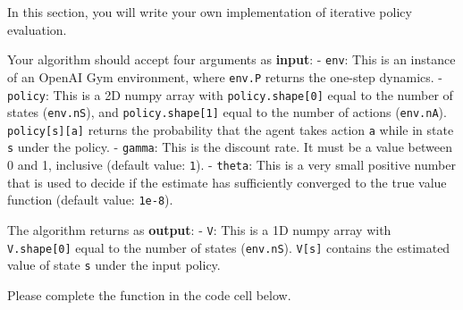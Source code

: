 \documentclass[11pt]{article}
\begin{document}
In this section, you will write your own implementation of iterative
policy evaluation.

Your algorithm should accept four arguments as \textbf{input}: -
\texttt{env}: This is an instance of an OpenAI Gym environment, where
\texttt{env.P} returns the one-step dynamics. - \texttt{policy}: This is
a 2D numpy array with \texttt{policy.shape{[}0{]}} equal to the number
of states (\texttt{env.nS}), and \texttt{policy.shape{[}1{]}} equal to
the number of actions (\texttt{env.nA}). \texttt{policy{[}s{]}{[}a{]}}
returns the probability that the agent takes action \texttt{a} while in
state \texttt{s} under the policy. - \texttt{gamma}: This is the
discount rate. It must be a value between 0 and 1, inclusive (default
value: \texttt{1}). - \texttt{theta}: This is a very small positive
number that is used to decide if the estimate has sufficiently converged
to the true value function (default value: \texttt{1e-8}).

The algorithm returns as \textbf{output}: - \texttt{V}: This is a 1D
numpy array with \texttt{V.shape{[}0{]}} equal to the number of states
(\texttt{env.nS}). \texttt{V{[}s{]}} contains the estimated value of
state \texttt{s} under the input policy.

Please complete the function in the code cell below.
\end{document}
